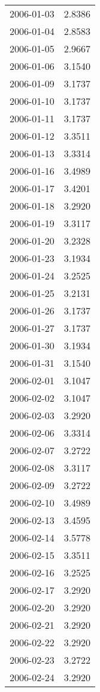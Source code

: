 \begin{tabular}{lr}
2006-01-03 &      2.8386 \\
2006-01-04 &      2.8583 \\
2006-01-05 &      2.9667 \\
2006-01-06 &      3.1540 \\
2006-01-09 &      3.1737 \\
2006-01-10 &      3.1737 \\
2006-01-11 &      3.1737 \\
2006-01-12 &      3.3511 \\
2006-01-13 &      3.3314 \\
2006-01-16 &      3.4989 \\
2006-01-17 &      3.4201 \\
2006-01-18 &      3.2920 \\
2006-01-19 &      3.3117 \\
2006-01-20 &      3.2328 \\
2006-01-23 &      3.1934 \\
2006-01-24 &      3.2525 \\
2006-01-25 &      3.2131 \\
2006-01-26 &      3.1737 \\
2006-01-27 &      3.1737 \\
2006-01-30 &      3.1934 \\
2006-01-31 &      3.1540 \\
2006-02-01 &      3.1047 \\
2006-02-02 &      3.1047 \\
2006-02-03 &      3.2920 \\
2006-02-06 &      3.3314 \\
2006-02-07 &      3.2722 \\
2006-02-08 &      3.3117 \\
2006-02-09 &      3.2722 \\
2006-02-10 &      3.4989 \\
2006-02-13 &      3.4595 \\
2006-02-14 &      3.5778 \\
2006-02-15 &      3.3511 \\
2006-02-16 &      3.2525 \\
2006-02-17 &      3.2920 \\
2006-02-20 &      3.2920 \\
2006-02-21 &      3.2920 \\
2006-02-22 &      3.2920 \\
2006-02-23 &      3.2722 \\
2006-02-24 &      3.2920 \\

\end{tabular}
